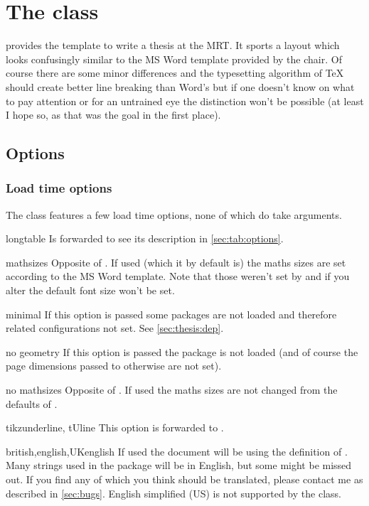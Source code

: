 \chapter{The  class}
 provides the template to write a thesis at the MRT. It sports a
layout which looks confusingly similar to the MS Word template provided by the
chair. Of course there are some minor differences and the typesetting algorithm
of TeX should create better line breaking than Word's but if one doesn't know on
what to pay attention or for an untrained eye the distinction won't be possible
(at least I hope so, as that was the goal in the first place).

\section{Options}%
\subsection{Load time options}\label{sec:thesis:opt}%
The class features a few load time options, none of which do take arguments.
\begin{describeopt}{longtable}
  Is forwarded to  see its description in \autoref{sec:tab:options}.
\end{describeopt}
\begin{describeopt}{mathsizes}
  Opposite of . If used (which it by default is) the maths
  sizes are set according to the MS Word template. Note that those weren't set
  by  and if you alter the default font size won't be set.
\end{describeopt}
\begin{describeopt}{minimal}
  If this option is passed some packages are not loaded and therefore related
  configurations not set. See \autoref{sec:thesis:dep}.
\end{describeopt}
\begin{describeopt}{no geometry}
  If this option is passed the  package is not loaded (and of
  course the page dimensions passed to  otherwise are not set).
\end{describeopt}
\begin{describeopt}{no mathsizes}
  Opposite of . If used the maths sizes are not changed from the
  defaults of .
\end{describeopt}
\begin{describeopt}{tikzunderline, tUline}
  This option is forwarded to .
\end{describeopt}
\begin{describeopt}{british,english,UKenglish}
  If used the document will be using the  definition of
  . Many strings used in the package will be in English, but some
  might be missed out. If you find any of which you think should be translated,
  please contact me as described in \autoref{sec:bugs}. English simplified (US)
  is not supported by the class.
\end{describeopt}

